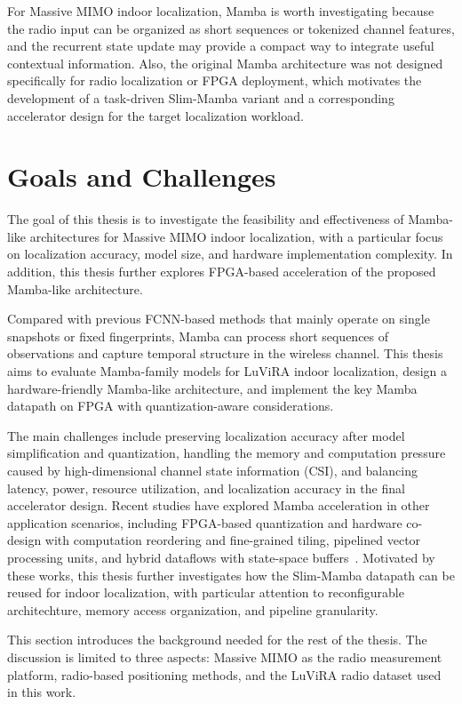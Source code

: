 \documentclass[11pt,twoside]{eitExjobb}
\makeatletter
\renewcommand\chapter{\clearpage\sh@chapter}
\makeatother
\begin{document}
For Massive MIMO indoor localization, Mamba is worth investigating because the
radio input can be organized as short sequences or tokenized channel features,
and the recurrent state update may provide a compact way to integrate useful
contextual information. Also, the original Mamba architecture was not
designed specifically for radio localization or FPGA deployment, which motivates the development of a task-driven Slim-Mamba variant
and a corresponding accelerator design for the target localization workload.

\section{Goals and Challenges}
The goal of this thesis is to investigate the feasibility and effectiveness of
Mamba-like architectures for Massive MIMO indoor localization, with a particular
focus on localization accuracy, model size, and hardware implementation
complexity. In addition, this thesis further explores FPGA-based acceleration of
the proposed Mamba-like architecture.

Compared with previous FCNN-based methods that mainly operate on single snapshots or
fixed fingerprints, Mamba can process short sequences of observations and capture
temporal structure in the wireless channel. This thesis aims to evaluate
Mamba-family models for LuViRA indoor localization, design a hardware-friendly
Mamba-like architecture, and implement the key Mamba datapath on FPGA with
quantization-aware considerations. 

The main challenges include preserving localization
accuracy after model simplification and quantization, handling the memory and
computation pressure caused by high-dimensional channel state information (CSI), and
balancing latency, power, resource utilization, and localization accuracy in the final accelerator design. Recent
studies have explored Mamba acceleration in other application scenarios, including
FPGA-based quantization and hardware co-design with computation reordering and
fine-grained tiling, pipelined vector processing units, and hybrid dataflows with
state-space buffers~\cite{cite:LightMamba2025,cite:FastMamba2025,cite:HCSA2025}.
Motivated by these works, this thesis further investigates how the Slim-Mamba datapath
can be reused for indoor localization, with particular attention to reconfigurable architechture,
memory access organization, and pipeline granularity.

\chapter{Background}
This section introduces the background needed for the rest of the thesis. The
discussion is limited to three aspects: Massive MIMO as the radio measurement
platform, radio-based positioning methods, and the LuViRA radio dataset used in
this work.
\end{document}
